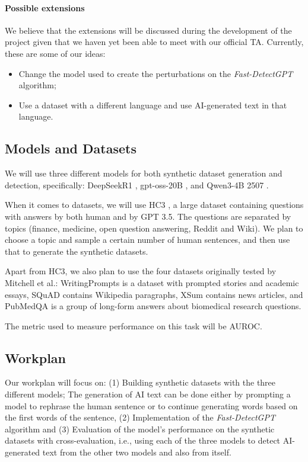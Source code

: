 \documentclass{article}
\begin{document}
\paragraph{Possible extensions} We believe that the extensions will be discussed during the development of the project given that we haven yet been able to meet with our official TA. Currently, these are some of our ideas:
\begin{itemize}
  \item Change the model used to create the perturbations on the \textit{Fast-DetectGPT} algorithm;
  \item Use a dataset with a different language and use AI-generated text in that language.
\end{itemize}

\subsection*{Models and Datasets}

We will use three different models for both synthetic dataset generation and detection, specifically: DeepSeekR1 \cite{deepseekai}, gpt-oss-20B \cite{gptoss20bmodel}, and Qwen3-4B 2507 \cite{Qwen3}.

When it comes to datasets, we will use HC3 \cite{HC3}, a large dataset containing questions with answers by both human and by GPT 3.5. The questions are separated by topics (finance, medicine, open question answering, Reddit and Wiki). We plan to choose a topic and sample a certain number of human sentences, and then use that to generate the synthetic datasets.

Apart from HC3, we also plan to use the four datasets originally tested by Mitchell et al.\cite{detectgpt}: WritingPrompts \cite{writingprompts} is a dataset with prompted stories and academic essays, SQuAD \cite{SQuAD} contains Wikipedia paragraphs, XSum \cite{XSum} contains news articles, and PubMedQA \cite{PubMedQA} is a group of long-form answers about biomedical research questions.

The metric used to measure performance on this task will be AUROC.

\subsection*{Workplan}

Our workplan will focus on: (1) Building synthetic datasets with the three different models; The generation of AI text can be done either by prompting a model to rephrase the human sentence or to continue generating words based on the first words of the sentence, (2) Implementation of the \textit{Fast-DetectGPT} algorithm and (3) Evaluation of the model's performance on the synthetic datasets with cross-evaluation, i.e., using each of the three models to detect AI-generated text from the other two models and also from itself.



\nocite{*}
\end{document}
